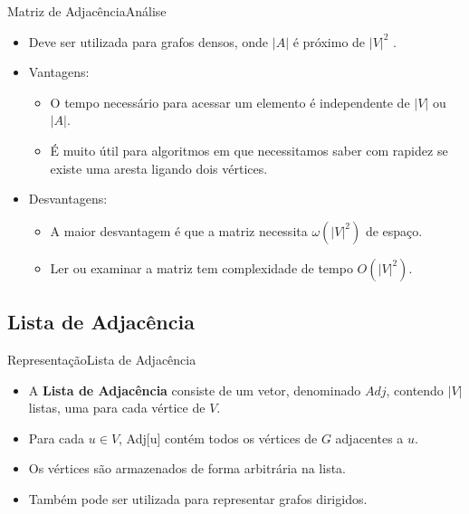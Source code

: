\documentclass[aspectratio=169]{beamer}
\begin{document}
\begin{frame}{Matriz de Adjacência}{Análise}
\begin{itemize}
\item Deve ser utilizada para grafos densos, onde $|A|$ é próximo de $|V|^2$ .
\item {\color{blue} Vantagens}:
\begin{itemize}
\item O tempo necessário para acessar um elemento é independente de $|V|$ ou $|A|$.
\item É muito útil para algoritmos em que necessitamos saber com rapidez se existe uma aresta ligando dois vértices.
\end{itemize}
\item {\color{red} Desvantagens}:
\begin{itemize}
\item A maior desvantagem é que a matriz necessita $\omega(|V|^2)$ de espaço. 
\item Ler ou examinar a matriz tem complexidade de tempo $O(|V|^2 )$.
\end{itemize}
\end{itemize}
\end{frame}

\subsection{Lista de Adjacência}

\begin{frame}{Representação}{Lista de Adjacência}
\begin{itemize}
\item A {\bf Lista de Adjacência} consiste de um vetor, denominado $Adj$, contendo $|V|$ listas, uma para cada vértice de $V$.
\item Para cada $u \in V$, Adj[u] contém todos os vértices de $G$ adjacentes a $u$.
\item Os vértices são armazenados de forma arbitrária na lista.
\item Também pode ser utilizada para representar grafos dirigidos.
\end{itemize}
\end{frame}

\end{document}
